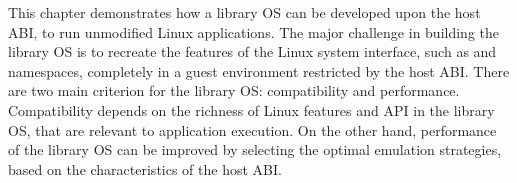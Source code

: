 This chapter
demonstrates how a library OS can be developed upon the host ABI,
to run unmodified Linux applications.
The major challenge in building the library OS
is to recreate the features of the Linux system interface, such as 
\linuxapis{} and namespaces, completely in a guest environment restricted by the host ABI.
There are two
main criterion for the library OS:
compatibility and performance.
Compatibility depends on
the richness of Linux features and API
in the library OS,
that are relevant to application execution.
On the other hand, performance of the library OS can be improved
by selecting the optimal emulation strategies,
based on the characteristics of the host ABI.





